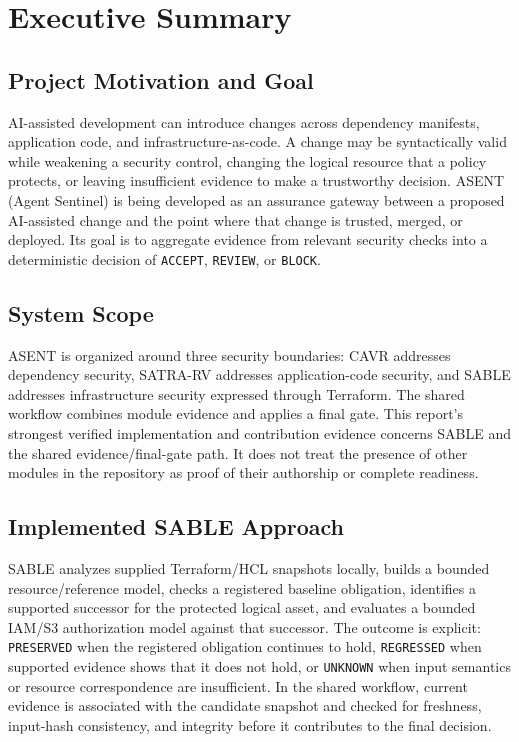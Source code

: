 \chapter*{Executive Summary}

\section*{Project Motivation and Goal}
AI-assisted development can introduce changes across dependency manifests, application code, and infrastructure-as-code. A change may be syntactically valid while weakening a security control, changing the logical resource that a policy protects, or leaving insufficient evidence to make a trustworthy decision. ASENT (Agent Sentinel) is being developed as an assurance gateway between a proposed AI-assisted change and the point where that change is trusted, merged, or deployed. Its goal is to aggregate evidence from relevant security checks into a deterministic decision of \texttt{ACCEPT}, \texttt{REVIEW}, or \texttt{BLOCK}.

\section*{System Scope}
ASENT is organized around three security boundaries: CAVR addresses dependency security, SATRA-RV addresses application-code security, and SABLE addresses infrastructure security expressed through Terraform. The shared workflow combines module evidence and applies a final gate. This report's strongest verified implementation and contribution evidence concerns SABLE and the shared evidence/final-gate path. It does not treat the presence of other modules in the repository as proof of their authorship or complete readiness.

\section*{Implemented SABLE Approach}
SABLE analyzes supplied Terraform/\allowbreak{}HCL snapshots locally, builds a bounded resource/\allowbreak{}reference model, checks a registered baseline obligation, identifies a supported successor for the protected logical asset, and evaluates a bounded IAM/\allowbreak{}S3 authorization model against that successor. The outcome is explicit: \texttt{PRESERVED} when the registered obligation continues to hold, \texttt{REGRESSED} when supported evidence shows that it does not hold, or \texttt{UNKNOWN} when input semantics or resource correspondence are insufficient. In the shared workflow, current evidence is associated with the candidate snapshot and checked for freshness, input-\allowbreak{}hash consistency, and integrity before it contributes to the final decision.

